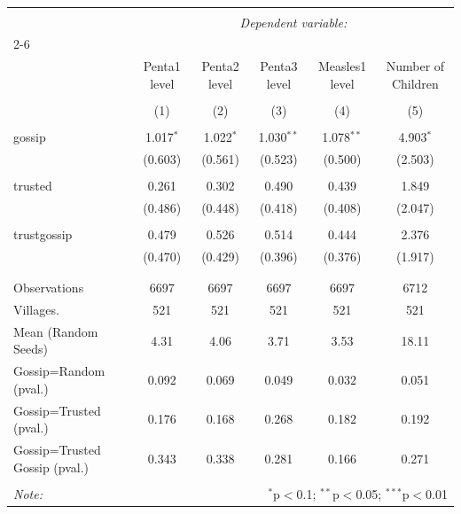 
\begin{table}[!htbp] \centering 
  \caption{} 
  \label{} 
\scriptsize 
\begin{tabular}{@{\extracolsep{0.25pt}}lccccc} 
\\[-1.8ex]\hline 
\hline \\[-1.8ex] 
 & \multicolumn{5}{c}{\textit{Dependent variable:}} \\ 
\cline{2-6} 
\\[-1.8ex] & Penta1 level & Penta2 level & Penta3 level & Measles1 level & Number of Children \\ 
\\[-1.8ex] & (1) & (2) & (3) & (4) & (5)\\ 
\hline \\[-1.8ex] 
 gossip & 1.017$^{*}$ & 1.022$^{*}$ & 1.030$^{**}$ & 1.078$^{**}$ & 4.903$^{*}$ \\ 
  & (0.603) & (0.561) & (0.523) & (0.500) & (2.503) \\ 
  & & & & & \\ 
 trusted & 0.261 & 0.302 & 0.490 & 0.439 & 1.849 \\ 
  & (0.486) & (0.448) & (0.418) & (0.408) & (2.047) \\ 
  & & & & & \\ 
 trustgossip & 0.479 & 0.526 & 0.514 & 0.444 & 2.376 \\ 
  & (0.470) & (0.429) & (0.396) & (0.376) & (1.917) \\ 
  & & & & & \\ 
\hline \\[-1.8ex] 
Observations & 6697 & 6697 & 6697 & 6697 & 6712 \\ 
Villages. & 521 & 521 & 521 & 521 & 521 \\ 
Mean (Random Seeds) & 4.31 & 4.06 & 3.71 & 3.53 & 18.11 \\ 
Gossip=Random (pval.) & 0.092 & 0.069 & 0.049 & 0.032 & 0.051 \\ 
Gossip=Trusted (pval.) & 0.176 & 0.168 & 0.268 & 0.182 & 0.192 \\ 
Gossip=Trusted Gossip (pval.) & 0.343 & 0.338 & 0.281 & 0.166 & 0.271 \\ 
\hline 
\hline \\[-1.8ex] 
\textit{Note:}  & \multicolumn{5}{r}{$^{*}$p$<$0.1; $^{**}$p$<$0.05; $^{***}$p$<$0.01} \\ 
\end{tabular} 
\end{table} 
